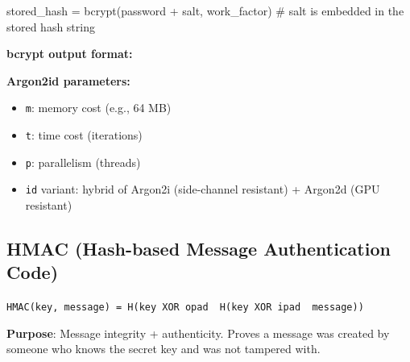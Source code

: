 \documentclass[11pt]{article}
\providecommand{\tightlist}{\setlength{\itemsep}{1pt}\setlength{\parskip}{0pt}}
\newenvironment{Shaded}{\begin{snugshade}}{\end{snugshade}}
\newcommand{\BuiltInTok}[1]{\textcolor[rgb]{0.50,0.55,0.55}{#1}}
\newcommand{\CommentTok}[1]{\textcolor[rgb]{0.48,0.49,0.49}{#1}}
\newcommand{\DecValTok}[1]{\textcolor[rgb]{0.96,0.45,0.00}{#1}}
\newcommand{\ErrorTok}[1]{\textcolor[rgb]{0.85,0.27,0.33}{\underline{#1}}}
\newcommand{\NormalTok}[1]{\textcolor[rgb]{0.81,0.81,0.76}{#1}}
\newcommand{\OperatorTok}[1]{\textcolor[rgb]{0.81,0.81,0.76}{#1}}
\begin{document}

\begin{Shaded}
\begin{Highlighting}[]
\NormalTok{stored\_hash }\OperatorTok{=}\NormalTok{ bcrypt(password }\OperatorTok{+}\NormalTok{ salt, work\_factor)}
\CommentTok{\# salt is embedded in the stored hash string}
\end{Highlighting}
\end{Shaded}

\textbf{bcrypt output format:}


\begin{Shaded}
\end{Shaded}

\textbf{Argon2id parameters:}

\begin{itemize}
\tightlist
\item
  \texttt{m}: memory cost (e.g., 64 MB)
\item
  \texttt{t}: time cost (iterations)
\item
  \texttt{p}: parallelism (threads)
\item
  \texttt{id} variant: hybrid of Argon2i (side-channel resistant) + Argon2d (GPU resistant)
\end{itemize}

\subsection{HMAC (Hash-based Message Authentication Code)}\label{hmac-hash-based-message-authentication-code}

\texttt{HMAC(key,\ message)\ =\ H(key\ XOR\ opad\ \textbar{}\textbar{}\ H(key\ XOR\ ipad\ \textbar{}\textbar{}\ message))}

\textbf{Purpose}: Message integrity + authenticity. Proves a message was created by someone who knows the secret key and was not tampered with.
\end{document}
